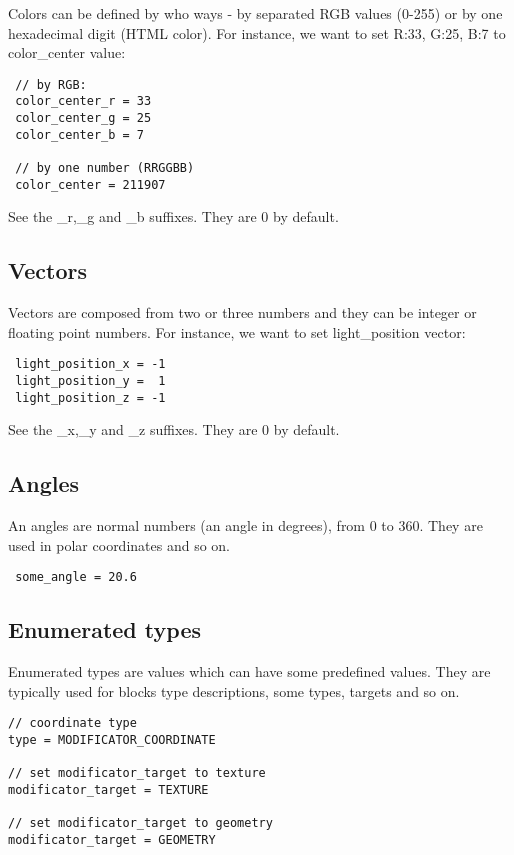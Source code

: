 \documentclass[11pt]{article}
\begin{document}
Colors can be defined by who ways - by separated RGB values
(0-255) or by one hexadecimal digit (HTML color). For instance, 
we want to set R:33, G:25, B:7 to color\_center value:

\begin{verbatim}
 // by RGB:
 color_center_r = 33
 color_center_g = 25
 color_center_b = 7
 
 // by one number (RRGGBB)
 color_center = 211907
\end{verbatim}

See the \_r,\_g and \_b suffixes. They are 0 by default.

\subsection{Vectors}

Vectors are composed from two or three numbers and they
can be integer or floating point numbers. For instance, we want to 
set light\_position vector:

\begin{verbatim}
 light_position_x = -1
 light_position_y =  1
 light_position_z = -1
\end{verbatim}

See the \_x,\_y and \_z suffixes. They are 0 by default.

\subsection{Angles}

An angles are normal numbers (an angle in degrees), from 0 to 360. 
They are used in polar coordinates and so on.

\begin{verbatim}
 some_angle = 20.6
\end{verbatim}

\subsection{Enumerated types}

Enumerated types are values which can have some predefined values. 
They are typically used for blocks type descriptions, some types,
targets and so on.

\begin{verbatim}
// coordinate type
type = MODIFICATOR_COORDINATE

// set modificator_target to texture
modificator_target = TEXTURE

// set modificator_target to geometry
modificator_target = GEOMETRY
\end{verbatim}
\end{document}
